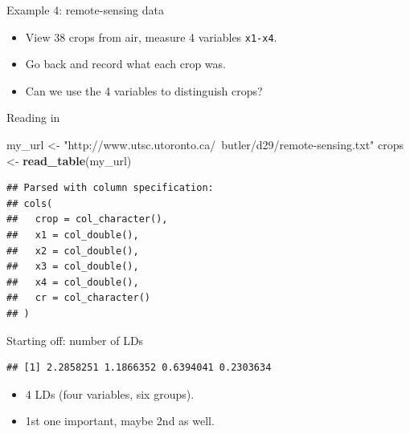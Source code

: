 \documentclass[ignorenonframetext,]{beamer}
\newenvironment{Shaded}{\begin{snugshade}}{\end{snugshade}}
\newcommand{\DataTypeTok}[1]{\textcolor[rgb]{0.13,0.29,0.53}{#1}}
\newcommand{\KeywordTok}[1]{\textcolor[rgb]{0.13,0.29,0.53}{\textbf{#1}}}
\newcommand{\NormalTok}[1]{#1}
\newcommand{\OperatorTok}[1]{\textcolor[rgb]{0.81,0.36,0.00}{\textbf{#1}}}
\newcommand{\StringTok}[1]{\textcolor[rgb]{0.31,0.60,0.02}{#1}}
\begin{document}
\begin{frame}[fragile]{Example 4: remote-sensing data}
\protect\hypertarget{example-4-remote-sensing-data}{}

\begin{itemize}
\item
  View 38 crops from air, measure 4 variables \texttt{x1-x4}.
\item
  Go back and record what each crop was.
\item
  Can we use the 4 variables to distinguish crops?
\end{itemize}

\end{frame}

\begin{frame}[fragile]{Reading in}
\protect\hypertarget{reading-in-1}{}

\begin{Shaded}
\begin{Highlighting}[]
\NormalTok{my_url <-}\StringTok{ "http://www.utsc.utoronto.ca/~butler/d29/remote-sensing.txt"}
\NormalTok{crops <-}\StringTok{ }\KeywordTok{read_table}\NormalTok{(my_url)}
\end{Highlighting}
\end{Shaded}

\begin{verbatim}
## Parsed with column specification:
## cols(
##   crop = col_character(),
##   x1 = col_double(),
##   x2 = col_double(),
##   x3 = col_double(),
##   x4 = col_double(),
##   cr = col_character()
## )
\end{verbatim}

\end{frame}

\begin{frame}[fragile]{Starting off: number of LDs}
\protect\hypertarget{starting-off-number-of-lds}{}

\begin{Shaded}
\end{Shaded}

\begin{verbatim}
## [1] 2.2858251 1.1866352 0.6394041 0.2303634
\end{verbatim}

\begin{itemize}
\item
  4 LDs (four variables, six groups).
\item
  1st one important, maybe 2nd as well.
\end{itemize}

\end{frame}
\end{document}

